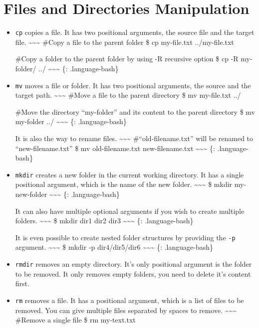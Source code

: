 \documentclass[
]{book}
\begin{document}
\hypertarget{files-and-directories-manipulation}{%
\section{Files and Directories Manipulation}\label{files-and-directories-manipulation}}

\begin{itemize}
\item
  \texttt{cp} copies a file. It has two positional arguments, the source file and the target file.
  \textasciitilde\textasciitilde\textasciitilde{}
  \#Copy a file to the parent folder
  \$ cp my-file.txt ../my-file.txt

  \#Copy a folder to the parent folder by using -R recursive option
  \$ cp -R my-folder/ ../
  \textasciitilde\textasciitilde\textasciitilde{}
  \{: .language-bash\}
\item
  \texttt{mv} moves a file or folder. It has two positional arguments, the source and the target path.
  \textasciitilde\textasciitilde\textasciitilde{}
  \#Move a file to the parent directory
  \$ mv my-file.txt ../

  \#Move the directory ``my-folder'' and its content to the parent directory
  \$ mv my-folder ../
  \textasciitilde\textasciitilde\textasciitilde{}
  \{: .language-bash\}

  It is also the way to rename files.
  \textasciitilde\textasciitilde\textasciitilde{}
  \#``old-filename.txt'' will be renamed to ``new-filename.txt''
  \$ mv old-filename.txt new-filename.txt
  \textasciitilde\textasciitilde\textasciitilde{}
  \{: .language-bash\}
\item
  \texttt{mkdir} creates a new folder in the current working directory. It has a single positional argument, which is the name of the new folder.
  \textasciitilde\textasciitilde\textasciitilde{}
  \$ mkdir my-new-folder
  \textasciitilde\textasciitilde\textasciitilde{}
  \{: .language-bash\}

  It can also have multiple optional arguments if you wish to create multiple folders.
  \textasciitilde\textasciitilde\textasciitilde{}
  \$ mkdir dir1 dir2 dir3
  \textasciitilde\textasciitilde\textasciitilde{}
  \{: .language-bash\}

  It is even possible to create nested folder structures by providing the \texttt{-p} argument.
  \textasciitilde\textasciitilde\textasciitilde{}
  \$ mkdir -p dir4/dir5/dir6
  \textasciitilde\textasciitilde\textasciitilde{}
  \{: .language-bash\}
\item
  \texttt{rmdir} removes an empty directory. It's only positional argument is the folder to be removed. It only removes empty folders, you need to delete it's content first.
\item
  \texttt{rm} removes a file. It has a positional argument, which is a list of files to be removed. You can give multiple files separated by spaces to remove.
  \textasciitilde\textasciitilde\textasciitilde{}
  \#Remove a single file
  \$ rm my-text.txt


\end{itemize}
\end{document}
